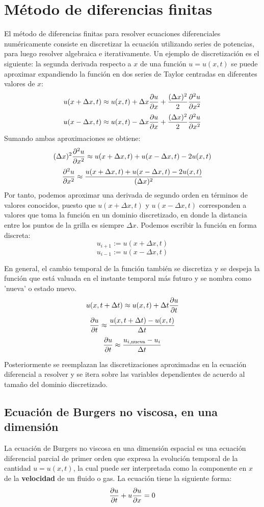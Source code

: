 \documentclass[12pt]{article}
\begin{document}
	\newpage
	\tableofcontents
	\clearpage
	
	\section{Método de diferencias finitas}
	El método de diferencias finitas para resolver ecuaciones diferenciales numéricamente consiste en discretizar la ecuación utilizando series de potencias, para luego resolver algebraica e iterativamente. Un ejemplo de discretización es el siguiente: la segunda derivada respecto a $x$ de una función $u = u(x,t)$ se puede aproximar expandiendo la función en dos series de Taylor centradas en diferentes valores de $x$:
	\[u(x + \Delta x,t) \approx u(x,t) + \Delta x\pdv{u}{x}+ \frac{(\Delta x)^{2}}{2}\pdv{^{2}u}{x^2} \]
	\[u(x - \Delta x,t) \approx u(x,t) - \Delta x\pdv{u}{x}+\frac{(\Delta x)^{2}}{2}\pdv{^{2}u}{x^2} \]	
	Sumando ambas aproximaciones se obtiene:
	\[(\Delta x)^2 \pdv{^{2}u}{x^2}\approx u(x + \Delta x,t) + u(x - \Delta x,t) - 2 u(x,t)\]
	\[\pdv{^{2}u}{x^2}\approx \frac{u(x + \Delta x,t) + u(x - \Delta x,t) - 2 u(x,t)}{(\Delta x)^2}\]
	Por tanto, podemos aproximar una derivada de segundo orden en términos de valores conocidos, puesto que $u(x + \Delta x,t)$ y $u(x - \Delta x,t)$ corresponden a valores que toma la función en un dominio discretizado, en donde la distancia entre los puntos de la grilla es siempre $\Delta x$. Podemos escribir la función en forma discreta:
	\[u_{i+1} := u(x + \Delta x,t)\]
	\[u_{i-1} := u(x - \Delta x,t)\]
	
	
	
	En general, el cambio temporal de la función también se discretiza y se despeja la función que está valuada en el instante temporal más futuro y se nombra como 'nueva' o estado nuevo.
	\[u(x,t+\Delta t)\approx u(x,t) + \Delta t \pdv{u}{t}\]
	\[\pdv{u}{t} \approx \frac{u(x,t+\Delta t) - u(x,t)}{\Delta t}\]
	\[\pdv{u}{t} \approx \frac{u_{i, \text{nueva}} - u_{i}}{\Delta t}\]
	
	Posteriormente se reemplazan las discretizaciones aproximadas en la ecuación diferencial a resolver y se itera sobre las variables dependientes de acuerdo al tamaño del dominio discretizado. 
	
	\subsection{Ecuación de Burgers no viscosa, en una dimensión}
	La ecuación de Burgers no viscosa en una dimensión espacial es una ecuación diferencial parcial de primer orden que expresa la evolución temporal de la cantidad $u = u(x,t)$, la cual puede ser interpretada como la componente en $x$ de la \textbf{velocidad} de un fluido o gas. La ecuación tiene la siguiente forma:
	\begin{equation}
		\pdv{u}{t}+u\pdv{u}{x}=0
	\end{equation}
	
\end{document}
